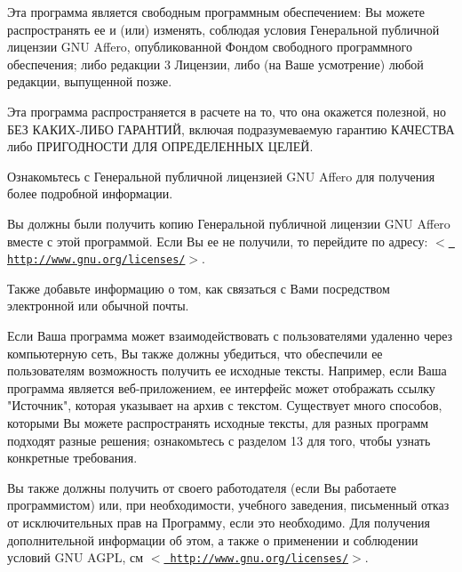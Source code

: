 Эта программа является свободным программным обеспечением\+: Вы можете распространять ее и (или) изменять, соблюдая условия Генеральной публичной лицензии GNU Affero, опубликованной Фондом свободного программного обеспечения; либо редакции 3 Лицензии, либо (на Ваше усмотрение) любой редакции, выпущенной позже.

Эта программа распространяется в расчете на то, что она окажется полезной, но БЕЗ КАКИХ-\/ЛИБО ГАРАНТИЙ, включая подразумеваемую гарантию КАЧЕСТВА либо ПРИГОДНОСТИ ДЛЯ ОПРЕДЕЛЕННЫХ ЦЕЛЕЙ.

Ознакомьтесь с Генеральной публичной лицензией GNU Affero для получения более подробной информации.

Вы должны были получить копию Генеральной публичной лицензии GNU Affero вместе с этой программой. Если Вы ее не получили, то перейдите по адресу\+: \texorpdfstring{$<$}{<}\href{http://www.gnu.org/licenses/}{\texttt{ http\+://www.\+gnu.\+org/licenses/}}\texorpdfstring{$>$}{>}.

Также добавьте информацию о том, как связаться с Вами посредством электронной или обычной почты.

Если Ваша программа может взаимодействовать с пользователями удаленно через компьютерную сеть, Вы также должны убедиться, что обеспечили ее пользователям возможность получить ее исходные тексты. Например, если Ваша программа является веб-\/приложением, ее интерфейс может отображать ссылку "{}Источник"{}, которая указывает на архив с текстом. Существует много способов, которыми Вы можете распространять исходные тексты, для разных программ подходят разные решения; ознакомьтесь с разделом 13 для того, чтобы узнать конкретные требования.

Вы также должны получить от своего работодателя (если Вы работаете программистом) или, при необходимости, учебного заведения, письменный отказ от исключительных прав на Программу, если это необходимо. Для получения дополнительной информации об этом, а также о применении и соблюдении условий GNU AGPL, см \texorpdfstring{$<$}{<}\href{http://www.gnu.org/licenses/}{\texttt{ http\+://www.\+gnu.\+org/licenses/}}\texorpdfstring{$>$}{>}. 